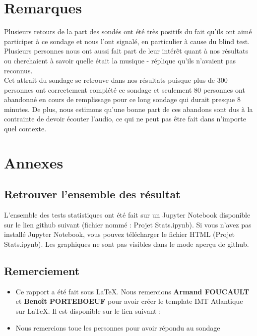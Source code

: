 \documentclass{article} %
\begin{document}
\section{Remarques}
Plusieurs retours de la part des sondés ont été très positifs du fait qu’ils ont aimé participer à ce sondage et nous l’ont signalé, en particulier à cause du blind test. Plusieurs personnes nous ont aussi fait part de leur intérêt quant à nos résultats ou cherchaient à savoir quelle était la musique - réplique qu’ils n’avaient pas reconnus.\\
Cet attrait du sondage se retrouve dans nos résultats puisque plus de 300 personnes ont correctement complété ce sondage et seulement 80 personnes ont abandonné en cours de remplissage pour ce long sondage qui durait presque 8 minutes. De plus, nous estimons qu’une bonne part de ces abandons sont dus à la contrainte de devoir écouter l’audio, ce qui ne peut pas être fait dans n’importe quel contexte.\\

\newpage
\section{Annexes}
\subsection{Retrouver l'ensemble des résultat}
L'ensemble des tests statistiques ont été fait sur un Jupyter Notebook disponible sur le lien github suivant (fichier nommé : Projet Stats.ipynb). Si vous n'avez pas installé Jupyter Notebook, vous pouvez télécharger le fichier HTML (Projet Stats.ipynb). Les graphiques ne sont pas visibles dans le mode aperçu de github.

\subsection{Remerciement}
\begin{itemize}
	\item Ce rapport a été fait sous LaTeX. Nous remercions \textbf{Armand FOUCAULT} et \textbf{Benoît PORTEBOEUF} pour avoir créer le template IMT Atlantique sur LaTeX. Il est disponible sur le lien suivant :
	\item Nous remercions toue les personnes pour avoir répondu au sondage
\end{itemize}


\imtaMakeCover
\end{document}
